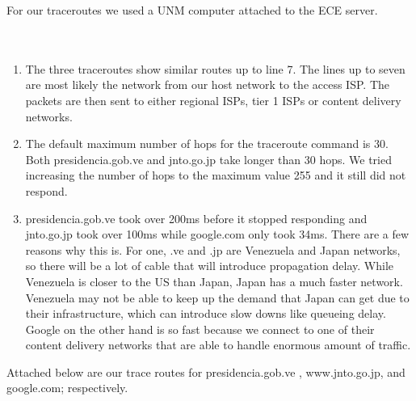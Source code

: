\documentclass{article}
\begin{document}
\lstset{language=} 

\centering
{
	For our traceroutes we used a UNM computer attached to the ECE server.\\
	\\
	\\
}
\begin{enumerate}
	\item The three traceroutes show similar routes up to line 7. The lines
			up to seven are most likely the network from our host network to the
			access ISP. The packets are then sent to either regional ISPs, tier 1
			ISPs or content delivery networks.

	\item The default maximum number of hops for the traceroute command is
			30. Both presidencia.gob.ve and jnto.go.jp take longer than 30 hops.
			We tried increasing the number of hops to the maximum value 255 and it
			still did not respond.

	\item presidencia.gob.ve took over 200ms before it stopped responding and
			jnto.go.jp took over 100ms while google.com only took 34ms. There are
			a few reasons why this is. For one, .ve and .jp are Venezuela and
			Japan networks, so there will be a lot of cable that will introduce
			propagation delay. While Venezuela is closer to the US than Japan,
			Japan has a much faster network. Venezuela may not be able to keep up
			the demand that Japan can get due to their infrastructure, which can
			introduce slow downs like queueing delay. Google on the other hand is
			so fast because we connect to one of their content delivery networks
			that are able to handle enormous amount of traffic.
\end{enumerate}

\centering
{	
	Attached below are our trace routes for  presidencia.gob.ve ,  www.jnto.go.jp, and google.com; respectively.\\
}

\\
\\
\\
\end{document}
